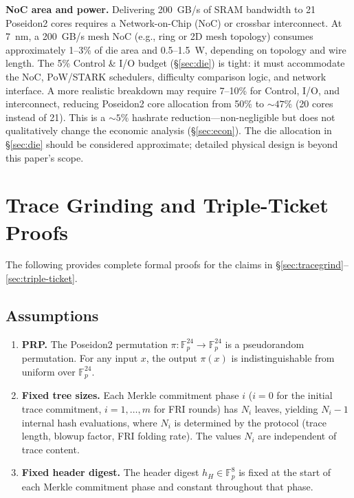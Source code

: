 \documentclass[11pt,a4paper]{article}
\begin{document}
\textbf{NoC area and power.} Delivering 200~GB/s of SRAM bandwidth to 21 Poseidon2 cores requires a Network-on-Chip (NoC) or crossbar interconnect. At 7~nm, a 200~GB/s mesh NoC (e.g., ring or 2D mesh topology) consumes approximately 1--3\% of die area and 0.5--1.5~W, depending on topology and wire length. The 5\% Control \& I/O budget (\S\ref{sec:die}) is tight: it must accommodate the NoC, PoW/STARK schedulers, difficulty comparison logic, and network interface. A more realistic breakdown may require 7--10\% for Control, I/O, and interconnect, reducing Poseidon2 core allocation from 50\% to ${\sim}47\%$ (20 cores instead of 21). This is a ${\sim}5\%$ hashrate reduction---non-negligible but does not qualitatively change the economic analysis (\S\ref{sec:econ}). The die allocation in \S\ref{sec:die} should be considered approximate; detailed physical design is beyond this paper's scope.

\section{Trace Grinding and Triple-Ticket Proofs}
\label{app:tracegrinding}

The following provides complete formal proofs for the claims in \S\ref{sec:tracegrind}--\ref{sec:triple-ticket}.

\subsection{Assumptions}

\begin{enumerate}
\item \textbf{PRP.} The Poseidon2 permutation $\pi: \mathbb{F}_p^{24} \to \mathbb{F}_p^{24}$ is a pseudorandom permutation. For any input $x$, the output $\pi(x)$ is indistinguishable from uniform over $\mathbb{F}_p^{24}$.
\item \textbf{Fixed tree sizes.} Each Merkle commitment phase $i$ ($i = 0$ for the initial trace commitment, $i = 1, \ldots, m$ for FRI rounds) has $N_i$ leaves, yielding $N_i - 1$ internal hash evaluations, where $N_i$ is determined by the protocol (trace length, blowup factor, FRI folding rate). The values $N_i$ are independent of trace content.
\item \textbf{Fixed header digest.} The header digest $h_H \in \mathbb{F}_p^8$ is fixed at the start of each Merkle commitment phase and constant throughout that phase.
\end{enumerate}
\end{document}
